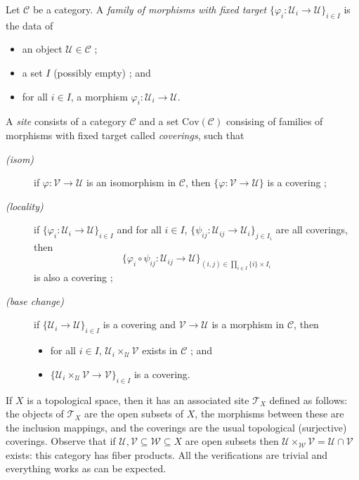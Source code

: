 \begin{definition}
Let $\mathcal{C}$ be a category. A \emph{family of morphisms with fixed target} 
$\{\varphi_i : \mathcal{U}_i \to \mathcal{U} \}_{i\in I}$ is the data of
\begin{itemize} 
\item an object $\mathcal{U} \in \mathcal{C}$ ; 
\item a set $I$ (possibly empty) ; and 
\item for all $i\in I$, a morphism $\varphi_i : \mathcal{U}_i \to \mathcal{U}$. 
\end{itemize}
A \emph{site} consists of a category $\mathcal{C}$ and a set 
$\text{Cov}(\mathcal{C})$ consising of families of morphisms with fixed target 
called \emph{coverings}, such that
\begin{description}
\item[\it(isom)]
if $\varphi : \mathcal{V} \to \mathcal{U}$ is an isomorphism in $\mathcal{C}$, 
then $\{\varphi : \mathcal{V} \to \mathcal{U}\}$ is a covering ;
\item[\it(locality)]
if $\{\varphi_i : \mathcal{U}_i \to \mathcal{U} \}_{i\in I}$ and for all $i \in 
I$, $\{\psi_{ij} : \mathcal{U}_{ij} \to \mathcal{U}_i \}_{j\in I_i}$ are all 
coverings, then
$$\{\varphi_i \circ \psi_{ij} : \mathcal{U}_{ij} \to 
\mathcal{U} \}_{(i,j)\in \prod_{i\in I} \{i\} \times I_i}
$$
is also a covering ;
\item[\it(base change)]
if $\{\mathcal{U}_i \to \mathcal{U} \}_{i\in I}$ is a covering and $\mathcal{V} 
\to \mathcal{U}$ is a morphism in $\mathcal{C}$, then
\begin{itemize}
\item for all $i \in I$, $\mathcal{U}_i \times_\mathcal{U} \mathcal{V}$ exists 
in $\mathcal{C}$ ; and
\item  $\{\mathcal{U}_i \times_\mathcal{U} \mathcal{V} \to \mathcal{V} \}_{i\in 
I}$ is a covering.
\end{itemize}
\end{description}
\end{definition}

\begin{example}
If $X$ is a topological space, then it has an associated site $\mathcal{T}_X$ 
defined as follows: the objects of $\mathcal{T}_X$ are the open subsets of $X$, 
the morphisms between these are the inclusion mappings, and the coverings are 
the usual topological (surjective) coverings. Observe that if $\mathcal{U}, 
\mathcal{V} \subseteq \mathcal{W} \subseteq X$ are open subsets then 
$\mathcal{U} \times_\mathcal{W} \mathcal{V} = \mathcal{U} \cap \mathcal{V}$ 
exists: this category has fiber products. All the verifications are trivial and 
everything works as can be expected. 
\end{example}

